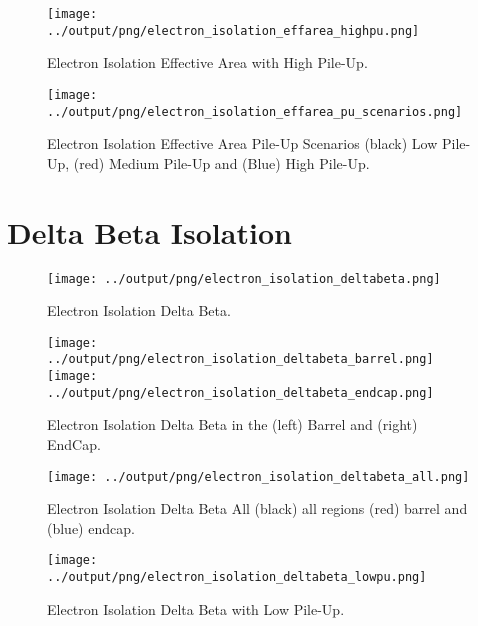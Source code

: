 \documentclass[11pt]{book}
\begin{document}
\begin{figure}[htbp]
\centering
\texttt{[image: ../output/png/electron\_isolation\_effarea\_highpu.png]}
\caption{Electron Isolation Effective Area with High Pile-Up.}
\label{fig:electron_isolation_effarea_highpu}
\end{figure}

\begin{figure}[htbp]
\centering
\texttt{[image: ../output/png/electron\_isolation\_effarea\_pu\_scenarios.png]}
\caption{Electron Isolation Effective Area Pile-Up Scenarios (black) Low Pile-Up, (red) Medium Pile-Up and (Blue) High Pile-Up.}
\label{fig:electron_isolation_effarea_pu_scenarios}
\end{figure}
\clearpage

\section{Delta Beta Isolation}

\begin{figure}[ht]
\centering
\texttt{[image: ../output/png/electron\_isolation\_deltabeta.png]}
\caption{Electron Isolation Delta Beta.}
\label{fig:electron_isolation_deltabeta}
\end{figure}

\begin{figure}[ht]
\centering
\texttt{[image: ../output/png/electron\_isolation\_deltabeta\_barrel.png]}
\texttt{[image: ../output/png/electron\_isolation\_deltabeta\_endcap.png]}
\caption{Electron Isolation Delta Beta in the (left) Barrel and (right) EndCap.}
\label{fig:electron_isolation_deltabeta_regions}
\end{figure}

\begin{figure}[ht]
\centering
\texttt{[image: ../output/png/electron\_isolation\_deltabeta\_all.png]}
\caption{Electron Isolation Delta Beta All (black) all regions (red) barrel and (blue) endcap.}
\label{fig:electron_isolation_deltabeta_all}
\end{figure}

\begin{figure}[htbp]
\centering
\texttt{[image: ../output/png/electron\_isolation\_deltabeta\_lowpu.png]}
\caption{Electron Isolation Delta Beta with Low Pile-Up.}
\label{fig:electron_isolation_deltabeta_lowpu}
\end{figure}
\end{document}
